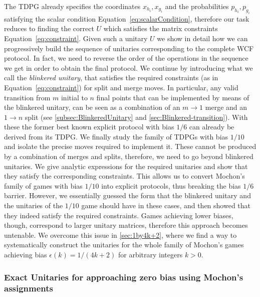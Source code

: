 \documentclass{theoretics}
\begin{document}
The TDPG already specifies the coordinates $x_{h_{i}},x_{g_{i}}$
and the probabilities $p_{h_{i}},p_{g_{i}}$ satisfying the scalar condition Equation~\eqref{eq:scalarCondition}, therefore our task reduces to finding the correct
$U$ which satisfies the matrix constraints Equation~\eqref{eq:constraint}.
Given such a unitary $U$ we show in detail how we can progressively build the sequence of unitaries corresponding to the complete WCF protocol. In fact, we need to reverse the order of the operations in the sequence we get in order to obtain the final protocol.
%
%
%
%
%
%
We continue by introducing what we call the \emph{blinkered
  unitary}, that satisfies the required constraints (as in Equation~\eqref{eq:constraint}) for split and
merge moves. In particular, any
valid transition from $m$ initial to $n$ final points that can be implemented by means of the blinkered unitary, can be seen as a combination of an $m\rightarrow 1$ merge and an $1\rightarrow n$ split (see \cref{subsec:BlinkeredUnitary} and \cref{sec:Blinkered-transition}).
With these the former best known explicit protocol with bias $1/6$ \cite{Mochon05} can already be derived
from its TDPG.  We finally study
the family of TDPGs with bias $1/10$ and isolate the precise moves required
to implement it. These cannot be produced by a combination of merges and splits, therefore, we need to go beyond blinkered unitaries. We give analytic expressions for the required
unitaries and show that they satisfy the corresponding constraints.
This allows us to convert Mochon's family of games with bias $1/10$
into explicit protocols, thus breaking the bias $1/6$ barrier.
However, we essentially guessed the form that the blinkered unitary and the unitaries of the $1/10$ game should have in these cases, and then showed that
they
indeed satisfy the required constraints.
Games achieving
lower biases, though, correspond to larger unitary matrices, therefore
this approach becomes untenable. We overcome this issue in  \cref{sec:1by4k+2}, where we find a way to systematically construct the unitaries for the whole family of Mochon's games achieving bias $\epsilon(k)=1/(4k+2)$ for arbitrary integers $k>0$.

\subsubsection{Exact Unitaries for approaching zero bias using Mochon's assignments\label{subsec:contralgebraic}}
\end{document}
